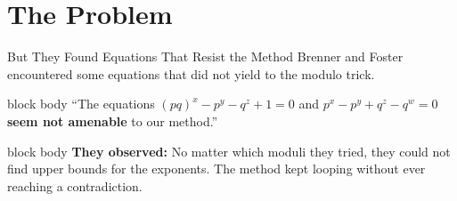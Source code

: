 \section{The Problem}

\begin{frame}{But They Found Equations That Resist the Method}
    \centering
    \normalsize Brenner and Foster encountered some equations that did not yield to the modulo trick.

    \vspace{0.25cm}
    \begin{beamercolorbox}[rounded=true,shadow=true,sep=0.75em,wd=1\textwidth,center]{block body}
        \small
        ``The equations $(pq)^x - p^y - q^z + 1 = 0$ and $p^x - p^y + q^z - q^w = 0$
        \textbf{seem not amenable} to our method.''
    \end{beamercolorbox}

    \vspace{0.25cm}
    \vspace{0.05cm}
    \begin{beamercolorbox}[rounded=true,shadow=true,sep=0.75em,wd=1\textwidth,center]{block body}
        \small
        \textbf{They observed:} No matter which moduli they tried, they could not find upper bounds
        for the exponents. The method kept looping without ever reaching a contradiction.
    \end{beamercolorbox}
\end{frame}

